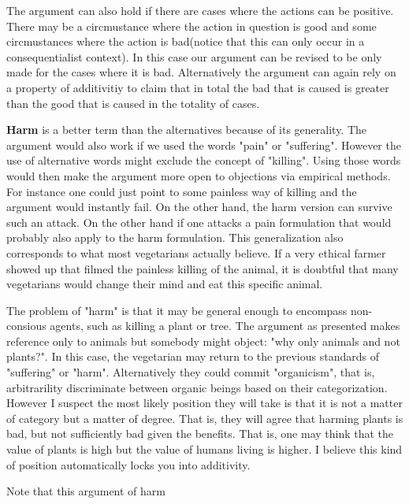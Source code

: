 The argument can also hold if there are cases where the actions can be positive. There may be a circmustance where the action in question is good and some circmustances where the action is bad(notice that this can only occur in a consequentialist context). In this case our argument can be revised to be only made for the cases where it is bad. Alternatively the argument can again rely on a property of additivitiy to claim that in total the bad that is caused is greater than the good that is caused in the totality of cases. 

\textbf{Harm} is a better term than the alternatives because of its generality. The argument would also work if we used the words "pain" or "suffering". However the use of alternative words might exclude the concept of "killing". Using those words would then make the argument more open to objections via empirical methods. For instance one could just point to some painless way of killing and the argument would instantly fail. On the other hand, the harm version can survive such an attack. On the other hand if one attacks a pain formulation that would probably also apply to the harm formulation. This generalization also corresponds to what most vegetarians actually believe. If a very ethical farmer showed up that filmed the painless killing of the animal, it is doubtful that many vegetarians would change their mind and eat this specific animal. 

The problem of "harm" is that it may be general enough to encompass non-consious agents, such as killing a plant or tree. The argument as presented makes reference only to animals but somebody might object: "why only animals and not plants?". In this case, the vegetarian may return to the previous standards of "suffering" or "harm". Alternatively they could commit "organicism", that is, arbitrarility discriminate between organic beings based on their categorization. However I suspect the most likely position they will take is that it is not a matter of category but a matter of degree. That is, they will agree that harming plants is bad, but not sufficiently bad given the benefits. That is, one may think that the value of plants is high but the value of humans living is higher. I believe this kind of position automatically locks you into additivity.  

Note that this argument of harm 



